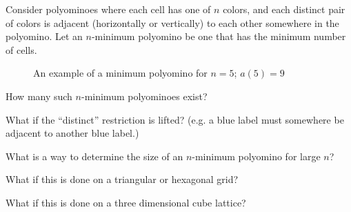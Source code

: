 \documentclass{article}
\begin{document}
  Consider polyominoes where each cell has one of $n$ colors, and
  each distinct pair of colors is adjacent (horizontally or vertically) to each other
  somewhere in the polyomino. Let an $n$-minimum polyomino be one that has the
  minimum number of cells.

\begin{figure}[!h]
  \centering
  \caption{An example of a minimum polyomino for $n = 5$; $a(5)=9$}
\end{figure}

\begin{question}
  How many such $n$-minimum polyominoes exist?
\end{question}
\begin{related}
  \item What if the ``distinct'' restriction is lifted?
    (e.g. a blue label must somewhere be adjacent to another blue label.)
  \item What is a way to determine the size of an $n$-minimum polyomino for
    large $n$?
  \item What if this is done on a triangular or hexagonal grid?
  \item What if this is done on a three dimensional cube lattice?
\end{related}
\end{document}
